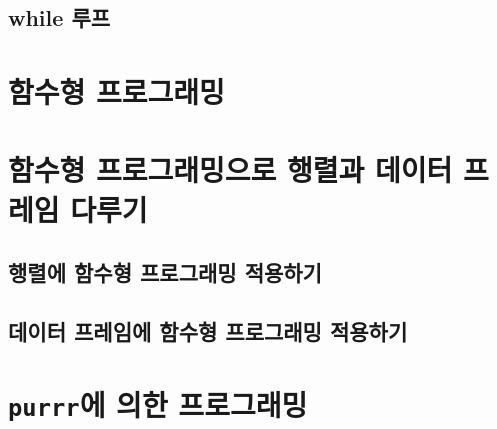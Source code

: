 \documentclass[
]{book}
\begin{document}
\hypertarget{while-uxb8e8uxd504}{%
\subsection{while 루프}\label{while-uxb8e8uxd504}}

\hypertarget{uxd568uxc218uxd615-uxd504uxb85cuxadf8uxb798uxbc0d}{%
\section{함수형 프로그래밍}\label{uxd568uxc218uxd615-uxd504uxb85cuxadf8uxb798uxbc0d}}

\hypertarget{uxd568uxc218uxd615-uxd504uxb85cuxadf8uxb798uxbc0duxc73cuxb85c-uxd589uxb82cuxacfc-uxb370uxc774uxd130-uxd504uxb808uxc784-uxb2e4uxb8e8uxae30}{%
\section{함수형 프로그래밍으로 행렬과 데이터 프레임 다루기}\label{uxd568uxc218uxd615-uxd504uxb85cuxadf8uxb798uxbc0duxc73cuxb85c-uxd589uxb82cuxacfc-uxb370uxc774uxd130-uxd504uxb808uxc784-uxb2e4uxb8e8uxae30}}

\hypertarget{uxd589uxb82cuxc5d0-uxd568uxc218uxd615-uxd504uxb85cuxadf8uxb798uxbc0d-uxc801uxc6a9uxd558uxae30}{%
\subsection{행렬에 함수형 프로그래밍 적용하기}\label{uxd589uxb82cuxc5d0-uxd568uxc218uxd615-uxd504uxb85cuxadf8uxb798uxbc0d-uxc801uxc6a9uxd558uxae30}}

\hypertarget{uxb370uxc774uxd130-uxd504uxb808uxc784uxc5d0-uxd568uxc218uxd615-uxd504uxb85cuxadf8uxb798uxbc0d-uxc801uxc6a9uxd558uxae30}{%
\subsection{데이터 프레임에 함수형 프로그래밍 적용하기}\label{uxb370uxc774uxd130-uxd504uxb808uxc784uxc5d0-uxd568uxc218uxd615-uxd504uxb85cuxadf8uxb798uxbc0d-uxc801uxc6a9uxd558uxae30}}

\hypertarget{purrruxc5d0-uxc758uxd55c-uxd504uxb85cuxadf8uxb798uxbc0d}{%
\section{\texorpdfstring{\texttt{purrr}에 의한 프로그래밍}{purrr에 의한 프로그래밍}}\label{purrruxc5d0-uxc758uxd55c-uxd504uxb85cuxadf8uxb798uxbc0d}}
\end{document}
